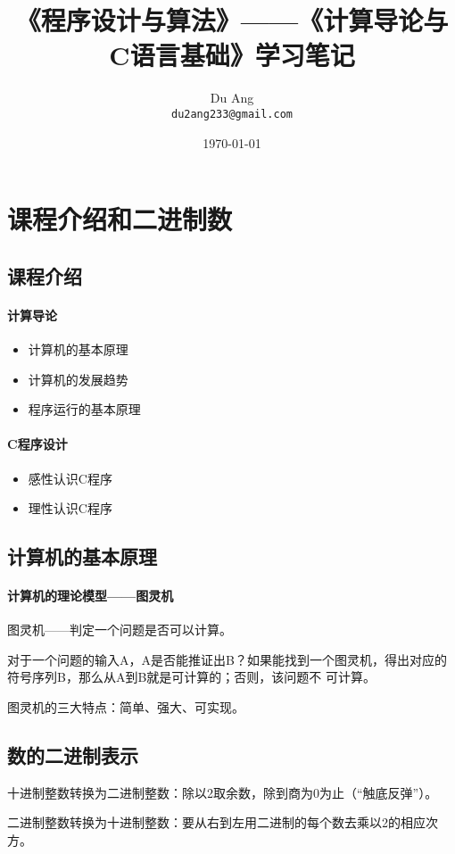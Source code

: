 \documentclass[UTF8]{ctexart}
\title{\heiti 《程序设计与算法》——《计算导论与C语言基础》学习笔记}
\author{\kaishu Du Ang \\ \texttt{du2ang233@gmail.com} }
\date{\today}
\begin{document}
\maketitle

\section{课程介绍和二进制数}
\subsection{课程介绍}
\paragraph{计算导论}
\begin{itemize}
    \item 计算机的基本原理
    \item 计算机的发展趋势
    \item 程序运行的基本原理
\end{itemize}

\paragraph{C程序设计}
\begin{itemize}
    \item 感性认识C程序
    \item 理性认识C程序
\end{itemize}

\subsection{计算机的基本原理}
\paragraph{计算机的理论模型——图灵机}
图灵机——判定一个问题是否可以计算。

对于一个问题的输入A，A是否能推证出B？如果能找到一个图灵机，得出对应的符号序列B，那么从A到B就是可计算的；否则，该问题不
可计算。

图灵机的三大特点：简单、强大、可实现。

\subsection{数的二进制表示}
十进制整数转换为二进制整数：除以2取余数，除到商为0为止（“触底反弹”）。

二进制整数转换为十进制整数：要从右到左用二进制的每个数去乘以2的相应次方。
\end{document}
